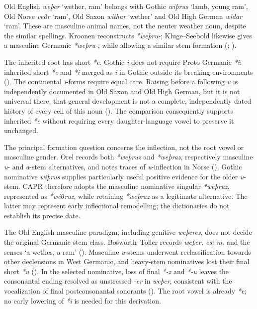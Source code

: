 \documentclass[
  british,
  a4paper,
]{article}
\begin{document}
Old English \emph{weþer} `wether, ram' belongs with Gothic \emph{wiþrus}
`lamb, young ram', Old Norse \emph{veðr} `ram', Old Saxon \emph{withar}
`wether' and Old High German \emph{widar} `ram'. These are masculine
animal names, not the neuter weather noun, despite the similar
spellings. Kroonen reconstructs \emph{*weþru-}; Kluge--Seebold likewise
gives a masculine Germanic \emph{*weþru-}, while allowing a similar stem
formation (;
).

The inherited root has short \emph{*e}. Gothic \emph{i} does not require
Proto-Germanic \emph{*i}: inherited short \emph{*e} and \emph{*i} merged
as \emph{i} in Gothic outside its breaking environments
(). The continental \emph{i}-forms
require equal care. Raising before a following \emph{u} is independently
documented in Old Saxon and Old High German, but it is not universal
there; that general development is not a complete, independently dated
history of every cell of this noun (). The comparison consequently supports inherited \emph{*e} without
requiring every daughter-language vowel to preserve it unchanged.

The principal formation question concerns the inflection, not the root
vowel or masculine gender. Orel records both \emph{*weþruz} and
\emph{*weþraz}, respectively masculine \emph{u}- and \emph{a}-stem
alternatives, and notes traces of \emph{u}-inflection in Norse
(). Gothic nominative
\emph{wiþrus} supplies particularly useful positive evidence for the
older \emph{u}-stem. CAPR therefore adopts the masculine nominative
singular \emph{*weþruz}, represented as \emph{*wéθruz}, while retaining
\emph{*weþraz} as a legitimate alternative. The latter may represent
early inflectional remodelling; the dictionaries do not establish its
precise date.

The Old English masculine paradigm, including genitive \emph{weþeres},
does not decide the original Germanic stem class. Bosworth--Toller
records \emph{weþer, es; m.} and the senses `a wether, a ram'
().
Masculine \emph{u}-stems underwent reclassification towards other
declensions in West Germanic, and heavy-stem nominatives lost their
final short \emph{*u} (). In the
selected nominative, loss of final \emph{*-z} and \emph{*-u} leaves the
consonantal ending resolved as unstressed \emph{-er} in \emph{weþer},
consistent with the vocalization of final postconsonantal sonorants
(). The root vowel is already
\emph{*e}; no early lowering of \emph{*i} is needed for this derivation.
\end{document}
